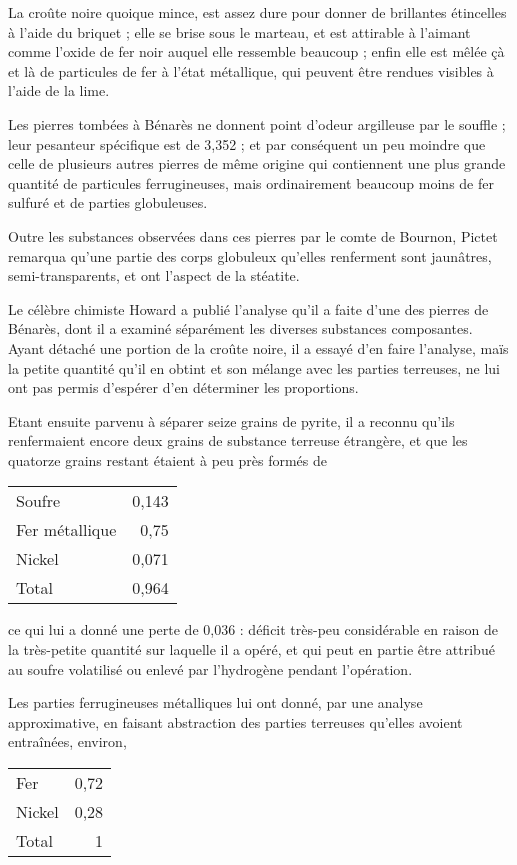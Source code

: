\documentclass[a4paper, 12pt, oneside, french]{article}
\begin{document}
La croûte noire quoique mince, est assez dure pour donner de brillantes étincelles à l'aide du briquet ; elle se brise sous le marteau, et est attirable à l'aimant comme l'oxide de fer noir auquel elle ressemble beaucoup ; enfin elle est mêlée çà et là de particules de fer à l'état métallique, qui peuvent être rendues visibles à l'aide de la lime.

Les pierres tombées à Bénarès ne donnent point d'odeur argilleuse par le souffle ; leur pesanteur spécifique est de 3,352 ; et par conséquent un peu moindre que celle de plusieurs autres pierres de même origine qui contiennent une plus grande quantité de particules ferrugineuses, mais ordinairement beaucoup moins de fer sulfuré et de parties globuleuses.

Outre les substances observées dans ces pierres par le comte de Bournon, Pictet remarqua qu'une partie des corps globuleux qu'elles renferment sont jaunâtres, semi-transparents, et ont l'aspect de la stéatite.

Le célèbre chimiste Howard a publié l'analyse qu'il a faite d'une des pierres de Bénarès, dont il a examiné séparément les diverses substances composantes. Ayant détaché une portion de la croûte noire, il a essayé d'en faire l'analyse, maïs la petite quantité qu'il en obtint et son mélange avec les parties terreuses, ne lui ont pas permis d'espérer d'en déterminer les proportions.

Etant ensuite parvenu à séparer seize grains de pyrite, il a reconnu qu'ils renfermaient encore deux grains de substance terreuse étrangère, et que les quatorze grains restant étaient à peu près formés de
\begin{table}[H]
    \centering
    \begin{tabular}{l r}
        Soufre & 0,143 \\
        Fer métallique & 0,75 \\
        Nickel & 0,071 \\ \hline
        Total & 0,964 \\
    \end{tabular}
\end{table}
ce qui lui a donné une perte de 0,036 : déficit très-peu considérable en raison de la très-petite quantité sur laquelle il a opéré, et qui peut en partie être attribué au soufre volatilisé ou enlevé par l'hydrogène pendant l'opération.

Les parties ferrugineuses métalliques lui ont donné, par une analyse approximative, en faisant abstraction des parties terreuses qu'elles avoient entraînées, environ,
\begin{table}[H]
    \centering
    \begin{tabular}{l r}
        Fer & 0,72 \\
        Nickel & 0,28 \\ \hline
        Total & 1 \\
    \end{tabular}
\end{table}
\end{document}
